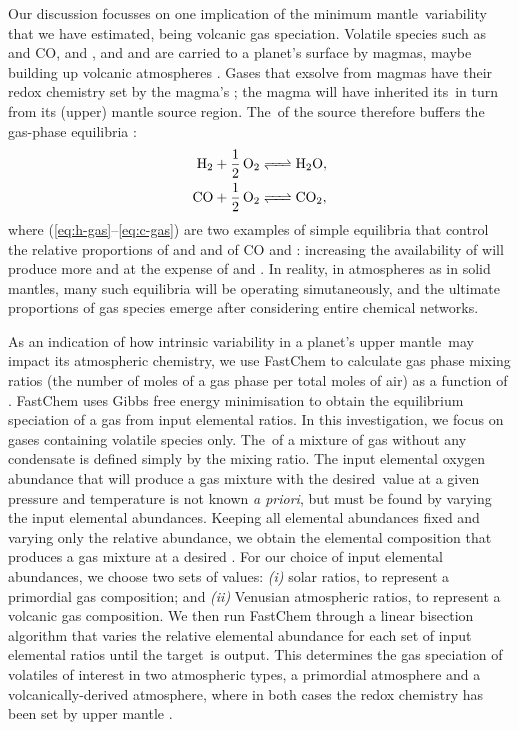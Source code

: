 Our discussion focusses on one implication of the minimum mantle \fo\,variability that we have estimated, being volcanic gas speciation. Volatile species such as  and CO,  and , and  and  are carried to a planet's surface by magmas, maybe building up volcanic atmospheres \citep[e.g.,][]{gaillard_theoretical_2014,liggins_growth_2022}. Gases that exsolve from magmas have their redox chemistry set by the magma's \fo; the magma will have inherited its \fo\,in turn from its (upper) mantle source region. The \fo\,of the source therefore buffers the gas-phase equilibria \citep[e.g.,][]{kasting_mantle_1993, burgisser_redox_2007, gaillard_redox_2015}:
\begin{align}
    \ce{H_2 + 1/2O2 &<=> H_2O},\label{eq:h-gas}\\
   \ce{CO + 1/2O2 &<=> CO_2},\label{eq:c-gas}
\end{align}
where (\ref{eq:h-gas}--\ref{eq:c-gas}) are two examples of simple equilibria that control the relative proportions of  and  and of CO and : increasing the availability of  will produce more  and  at the expense of  and . In reality, in atmospheres as in solid mantles, many such equilibria will be operating simutaneously, and the ultimate proportions of gas species emerge after considering entire chemical networks.

As an indication of how intrinsic variability in a planet's upper mantle \fo\,may impact its atmospheric chemistry, we use FastChem \citep{kitzmann_fastchem_2018, stock_fastchem_2022} to calculate gas phase mixing ratios (the number of moles of a gas phase per total moles of air) as a function of \fo. FastChem uses Gibbs free energy minimisation to obtain the equilibrium speciation of a gas from input elemental ratios. In this investigation, we focus on gases containing volatile  species only. The \fo\,of a mixture of gas without any condensate is defined simply by the  mixing ratio. The input elemental oxygen abundance that will produce a  gas mixture with the desired \fo\,value at a given pressure and temperature is not known \textit{a priori}, but must be found by varying the input elemental abundances. Keeping all elemental abundances fixed and varying only the relative  abundance, we obtain the elemental composition that produces a gas mixture at a desired \fo. For our choice of input elemental abundances, we choose two sets of values: \textit{(i)} solar  ratios, to represent a primordial gas composition; and \textit{(ii)} Venusian atmospheric  ratios, to represent a volcanic gas composition. We then run FastChem through a linear bisection algorithm that varies the relative elemental  abundance for each set of input elemental ratios until the target \fo\,is output. This determines the gas speciation of volatiles of interest in two atmospheric types, a primordial atmosphere and a volcanically-derived atmosphere, where in both cases the redox chemistry has been set by upper mantle \fo. 

